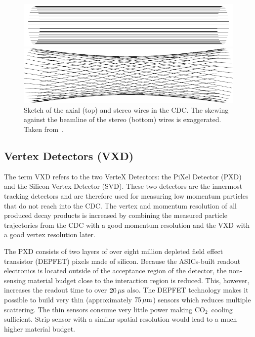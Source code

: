 \begin{figure}
  \centering
  \includegraphics{figures/experimental_setup/axialLayers.pdf}
  
  \vspace*{1.5cm}
  
  \includegraphics{figures/experimental_setup/stereoLayers.pdf}
  \caption[Sketch of the axial (top) and stereo wires in the CDC.]{Sketch of the axial (top) and stereo wires in the CDC. The skewing against the beamline of the stereo (bottom) wires is exaggerated. Taken from~\cite{oliver}.}
  \label{fig-axial-stereo}
\end{figure}

\subsection{Vertex Detectors (VXD)}
The term VXD refers to the two VerteX Detectors: the PiXel Detector (PXD) and the Silicon Vertex Detector (SVD). These two detectors are the innermost tracking detectors and are therefore used for measuring low momentum particles that do not reach into the CDC. The vertex and momentum resolution of all produced decay products is increased by combining the measured particle trajectories from the CDC with a good momentum resolution and the VXD with a good vertex resolution later.

The PXD consists of two layers of over eight million depleted field effect transistor (DEPFET) pixels made of silicon. Because the ASICs-built readout electronics is located outside of the acceptance region of the detector, the non-sensing material budget close to the interaction region is reduced. This, however, increases the readout time to over $\unit[20]{\mu s}$ also. The DEPFET technology makes it possible to build very thin (approximately $\unit[75]{\mu m}$) sensors which reduces multiple scattering. The thin sensors consume very little power making $\mathrm{CO}_2$~cooling sufficient. Strip sensor with a similar spatial resolution would lead to a much higher material budget.

